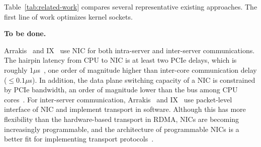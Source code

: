 \begin{table}[t]
	\centering
{}
	\caption{Comparison of high performance socket systems.}
	\label{tab:related-work}
\end{table}

Table~\ref{tab:related-work} compares several representative existing approaches. The first line of work optimizes kernel sockets.

\textbf{To be done.}

Arrakis~\cite{peter2016arrakis} and IX~\cite{belay2017ix} use NIC for both intra-server and inter-server communications. The hairpin latency from CPU to NIC is at least two PCIe delays, which is roughly 1$\mu$s~\cite{kaminsky2016design}, one order of magnitude higher than inter-core communication delay ($\leq0.1\mu$s). In addition, the data plane switching capacity of a NIC is constrained by PCIe bandwidth, an order of magnitude lower than the bus among CPU cores~\cite{li2017kv}. For inter-server communication, Arrakis~\cite{peter2016arrakis} and IX~\cite{belay2017ix} use packet-level interface of NIC and implement transport in software. Although this has more flexibility than the hardware-based transport in RDMA, NICs are becoming increasingly programmable, and the architecture of programmable NICs is a better fit for implementing transport protocols~\cite{kaufmann2015flexnic,smartnic,mellanox,cavium}. 



